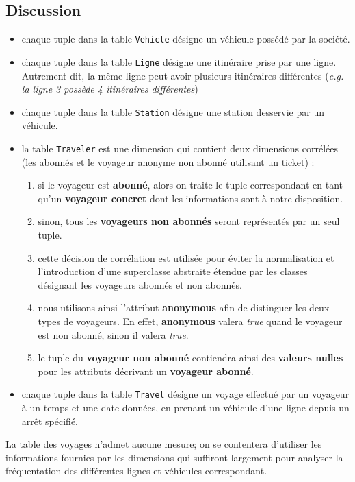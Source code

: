 \documentclass[a4paper,12pt]{report}
\begin{document}
\newpage

\subsection{Discussion}
\begin{itemize}
  \item chaque tuple dans la table \texttt{Vehicle} désigne un véhicule possédé par la société.
  \item chaque tuple dans la table \texttt{Ligne} désigne une itinéraire prise par une ligne. Autrement dit, la même ligne peut avoir plusieurs itinéraires différentes (\textit{e.g. la ligne 3 possède 4 itinéraires différentes})
  \item chaque tuple dans la table \texttt{Station} désigne une station desservie par un véhicule.
  \item la table \texttt{Traveler} est une dimension qui contient deux dimensions corrélées (les abonnés et le voyageur anonyme non abonné utilisant un ticket) :
  \begin{enumerate}
    \item si le voyageur est \textbf{abonné}, alors on traite le tuple correspondant en tant qu'un \textbf{voyageur concret} dont les informations sont à notre disposition.
    \item sinon, tous les \textbf{voyageurs non abonnés} seront représentés par un seul tuple.
    \item cette décision de corrélation est utilisée pour éviter la normalisation et l'introduction d'une superclasse abstraite étendue par les classes désignant les voyageurs abonnés et non abonnés.
    \item nous utilisons ainsi l'attribut \textbf{anonymous} afin de distinguer les deux types de voyageurs. En effet, \textbf{anonymous} valera \textit{true} quand le voyageur est non abonné, sinon il valera \textit{true}.
    \item le tuple du \textbf{voyageur non abonné} contiendra ainsi des \textbf{valeurs nulles} pour les attributs décrivant un \textbf{voyageur abonné}.
  \end{enumerate}
  \item chaque tuple dans la table \texttt{Travel} désigne un voyage effectué par un voyageur à un temps et une date données, en prenant un véhicule d'une ligne depuis un arrêt spécifié.
\end{itemize}

La table des voyages n'admet aucune mesure; on se contentera d'utiliser les informations fournies par les dimensions qui suffiront largement pour analyser la fréquentation des différentes lignes et véhicules correspondant.
\end{document}
